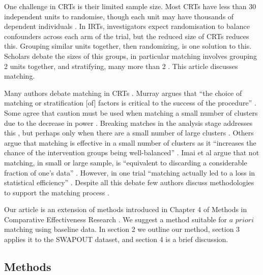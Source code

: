 \documentclass[]{sagej}
\begin{document}
One challenge in CRTs is their limited sample size. Most CRTs have less
than 30 independent units to randomise, though each unit may have
thousands of dependent individuals \citep{balzer2012match}. In IRTs,
investigators expect randomisation to balance confounders across each
arm of the trial, but the reduced size of CRTs reduces this. Grouping
similar units together, then randomizing, is one solution to this.
Scholars debate the sizes of this groups, in particular matching
involves grouping 2 units together, and stratifying, many more than 2
\citep{PMVsStrat}. This article discusses matching.

Many authors debate matching in CRTs
\citep{balzer2012match, CRTrials2009, gatsonis2017methods, diehr1995breaking, murray1998design, imai2009essential, PMVsStrat, donner2007merits, klar1997merits, donner2000design, martin1993effect}.
Murray argues that ``the choice of matching or stratification {[}of{]}
factors is critical to the success of the procedure''
\citep{murray1998design}. Some agree that caution must be used when
matching a small number of clusters due to the decrease in power
\citep{donner2000design, klar1997merits, balzer2012match, martin1993effect}.
Breaking matches in the analysis stage addresses this
\citep{diehr1995breaking}, but perhaps only when there are a small
number of large clusters \citep{donner2007merits}. Others argue that
matching is effective in a small number of clusters as it ``increases
the chance of the intervention groups being well-balanced''
\citep{donner2007merits}. Imai et al argue that not matching, in small
or large sample, is ``equivalent to discarding a considerable fraction
of one's data'' \citep{imai2009essential}. However, in one trial
``matching actually led to a loss in statistical efficiency''
\citep[\citet{donner2000design}]{manun1994influence}. Despite all this
debate few authors discuss methodologies to support the matching process
\citep{raab2001balance}.

Our article is an extension of methods introduced in Chapter 4 of
Methods in Comparative Effectiveness Research
\citep{gatsonis2017methods}. We suggest a method suitable for \(a\)
\(priori\) matching using baseline data. In section 2 we outline our
method, section 3 applies it to the SWAPOUT dataset, and section 4 is a
brief discussion.

\subsection{Methods }\label{methods}
\end{document}
